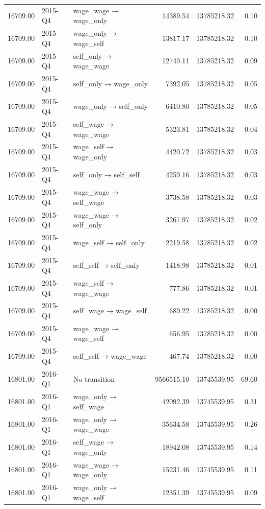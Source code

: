 \begin{table}[ht]
{\begin{tabular}{rllrrr}
  16709.00 & 2015-Q4 & wage\_wage → wage\_only & 14389.54 & 13785218.32 & 0.10 \\ 
  16709.00 & 2015-Q4 & wage\_only → wage\_self & 13817.17 & 13785218.32 & 0.10 \\ 
  16709.00 & 2015-Q4 & self\_only → wage\_wage & 12740.11 & 13785218.32 & 0.09 \\ 
  16709.00 & 2015-Q4 & self\_only → wage\_only & 7392.05 & 13785218.32 & 0.05 \\ 
  16709.00 & 2015-Q4 & wage\_only → self\_only & 6410.80 & 13785218.32 & 0.05 \\ 
  16709.00 & 2015-Q4 & self\_wage → wage\_wage & 5323.81 & 13785218.32 & 0.04 \\ 
  16709.00 & 2015-Q4 & wage\_self → wage\_only & 4420.72 & 13785218.32 & 0.03 \\ 
  16709.00 & 2015-Q4 & self\_only → self\_self & 4259.16 & 13785218.32 & 0.03 \\ 
  16709.00 & 2015-Q4 & wage\_wage → self\_wage & 3738.58 & 13785218.32 & 0.03 \\ 
  16709.00 & 2015-Q4 & wage\_wage → self\_only & 3267.97 & 13785218.32 & 0.02 \\ 
  16709.00 & 2015-Q4 & wage\_self → self\_only & 2219.58 & 13785218.32 & 0.02 \\ 
  16709.00 & 2015-Q4 & self\_self → self\_only & 1418.98 & 13785218.32 & 0.01 \\ 
  16709.00 & 2015-Q4 & wage\_self → wage\_wage & 777.86 & 13785218.32 & 0.01 \\ 
  16709.00 & 2015-Q4 & self\_wage → wage\_self & 689.22 & 13785218.32 & 0.00 \\ 
  16709.00 & 2015-Q4 & wage\_wage → wage\_self & 656.95 & 13785218.32 & 0.00 \\ 
  16709.00 & 2015-Q4 & self\_self → wage\_wage & 467.74 & 13785218.32 & 0.00 \\ 
  16801.00 & 2016-Q1 & No transition & 9566515.10 & 13745539.95 & 69.60 \\ 
  16801.00 & 2016-Q1 & wage\_only → self\_wage & 42092.39 & 13745539.95 & 0.31 \\ 
  16801.00 & 2016-Q1 & wage\_only → wage\_wage & 35634.58 & 13745539.95 & 0.26 \\ 
  16801.00 & 2016-Q1 & self\_wage → wage\_only & 18942.08 & 13745539.95 & 0.14 \\ 
  16801.00 & 2016-Q1 & wage\_wage → wage\_only & 15231.46 & 13745539.95 & 0.11 \\ 
  16801.00 & 2016-Q1 & wage\_only → wage\_self & 12351.39 & 13745539.95 & 0.09 \\ 

\end{tabular}}
\end{table}
